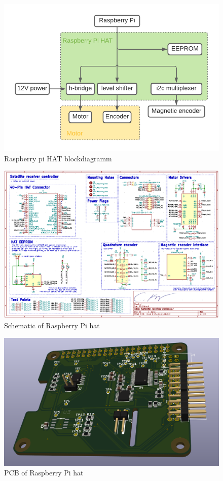 \begin{figure}[h]
	\centering
	\includegraphics[width=\linewidth]{../art/PCB Block diagram.pdf}
	\caption{Raspberry pi HAT blockdiagramm}
\end{figure}

\begin{figure}[h]
	\centering
	\includegraphics[width=\linewidth]{../art/pcbSchematic.png}
	\caption{Schematic of Raspberry Pi hat}
\end{figure}


\begin{figure}[h]
	\centering
	\includegraphics[width=\linewidth]{../art/PCB.png}
	\caption{PCB of Raspberry Pi hat}
\end{figure}


